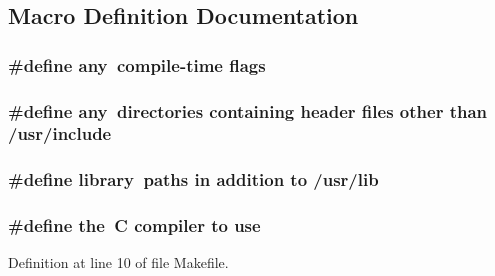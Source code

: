 \subsection{Macro Definition Documentation}
\hypertarget{ClientServer_2server_2Makefile_a6120b6f1abea66c8ede7b300a66d4cc0}{
\subsubsection[{any}]{\setlength{\rightskip}{0pt plus 5cm}\#define any~compile-\/time flags}}\label{ClientServer_2server_2Makefile_a6120b6f1abea66c8ede7b300a66d4cc0}
\hypertarget{ClientServer_2server_2Makefile_a6120b6f1abea66c8ede7b300a66d4cc0}{
\subsubsection[{any}]{\setlength{\rightskip}{0pt plus 5cm}\#define any~directories containing header files other than /usr/include}}\label{ClientServer_2server_2Makefile_a6120b6f1abea66c8ede7b300a66d4cc0}
\hypertarget{ClientServer_2server_2Makefile_a1f477410360bd4832116581b9934ab71}{
\subsubsection[{library}]{\setlength{\rightskip}{0pt plus 5cm}\#define library~paths in addition to /usr/lib}}\label{ClientServer_2server_2Makefile_a1f477410360bd4832116581b9934ab71}
\hypertarget{ClientServer_2server_2Makefile_a09c6b60bb7451f9136e25140ffdff6bd}{
\subsubsection[{the}]{\setlength{\rightskip}{0pt plus 5cm}\#define the~C compiler to use}}\label{ClientServer_2server_2Makefile_a09c6b60bb7451f9136e25140ffdff6bd}


Definition at line 10 of file Makefile.

